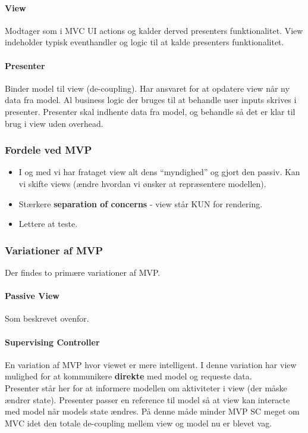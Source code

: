 \paragraph{View} Modtager som i MVC UI actions og kalder derved presenters funktionalitet. View indeholder typisk eventhandler og logic til at kalde presenters funktionalitet.
\paragraph{Presenter} Binder model til view (de-coupling). Har ansvaret for at opdatere view når ny data fra model. Al business logic der bruges til at behandle user inputs skrives i presenter. Presenter skal indhente data fra model, og behandle så det er klar til brug i view uden overhead.

\subsubsection{Fordele ved MVP}
\begin{itemize}
	\item I og med vi har frataget view alt dens “myndighed” og gjort den passiv. Kan vi skifte views (ændre hvordan vi ønsker at repræsentere modellen).
	\item Stærkere \textbf{separation of concerns} - view står KUN for rendering.
	\item Lettere at teste.
\end{itemize}

\subsubsection{Variationer af MVP}
Der findes to primære variationer af MVP.

\paragraph{Passive View}
Som beskrevet ovenfor.

\paragraph{Supervising Controller}
En variation af MVP hvor viewet er mere intelligent. I denne variation har view mulighed for at kommunikere \textbf{direkte} med model og requeste data.\\

Presenter står her for at informere modellen om aktiviteter i view (der måske ændrer state). Presenter passer en reference til model så at view kan interacte med model når models state ændres. På denne måde minder MVP SC meget om MVC idet den totale de-coupling mellem view og model nu er blevet vag.
